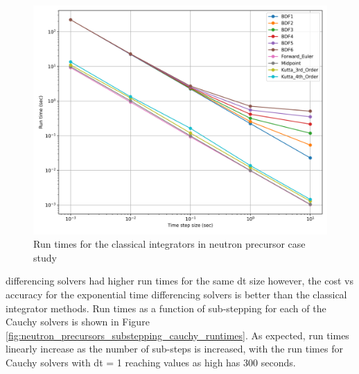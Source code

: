 \clearpage

\begin{figure}[p]
    \centering
    \includegraphics[width=5in]{images/chapter-5/caseStudies/neutronPrecursors/neutronPrecursorsIntegratorRuntimes.png}
    \caption{Run times for the classical integrators in neutron precursor case study}
    \label{fig:neutron_precursors_classical_integrators_runtimes}
\end{figure}

\clearpage

\noindent differencing solvers had higher run times for the same dt size however, the cost vs accuracy for the exponential time differencing solvers is better than the classical integrator methods. Run times as a function of sub-stepping for each of the Cauchy solvers is shown in Figure \ref{fig:neutron_precursors_substepping_cauchy_runtimes}. As expected, run times linearly increase as the number of sub-steps is increased, with the run times for Cauchy solvers with dt = 1 reaching values as high has 300 seconds. 

